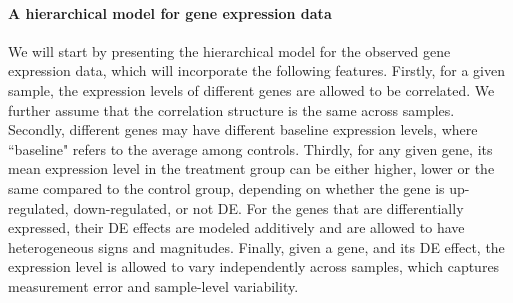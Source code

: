 	\paragraph{A hierarchical model for gene expression data}\label{subsection:YModel}
	We will start by presenting the hierarchical model for the observed gene expression data, which
	will incorporate the following features. 
	Firstly, for a given sample, the expression levels of different genes are allowed to be
	correlated. We further assume that the correlation structure is the same across samples. 
	Secondly,
	different genes may have different baseline expression levels, where ``baseline" refers to the
	average among controls. Thirdly, for any given gene, its mean expression level in the treatment
	group can be either higher, lower or the same compared to the control group, depending on 
	whether
	the gene is up-regulated, down-regulated, or not DE. For the genes that are differentially
	expressed, their DE effects are modeled additively and are allowed to have heterogeneous signs 
	and
	magnitudes. Finally, given a gene, and its DE effect, the expression level is allowed to vary
	independently across samples, which captures measurement error and sample-level variability.
	
